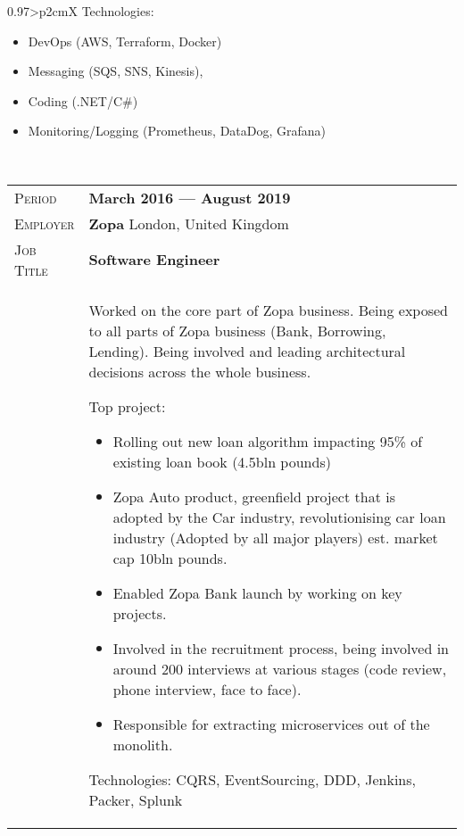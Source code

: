 \documentclass[a4paper, oneside, final]{article}
\begin{document}
\begin{center}
\begin{tabularx}{0.97\linewidth}{>{\raggedleft\scshape}p{2cm}X}
	Technologies:
	\begin{itemize}
	\item DevOps (AWS, Terraform, Docker)
	\item Messaging (SQS, SNS, Kinesis), 
	\item Coding (.NET/C\#)
	\item Monitoring/Logging (Prometheus, DataDog, Grafana)
	\end{itemize}
	\\
 \end{tabularx}
 \vspace{12pt}
 
\begin{tabularx}{0.97\linewidth}{>{\raggedleft\scshape}p{2cm}X}
 Period & \textbf{March 2016 --- August 2019 }\\
 Employer & \textbf{Zopa} \hfill London, United Kingdom\\
 Job Title & \textbf{Software Engineer}\\ 
	& Worked on the core part of Zopa business.
	 Being exposed to all parts of Zopa business (Bank, Borrowing, Lending).
	 Being involved and leading architectural decisions across the whole business.
	
	Top project:
	\begin{itemize}
	\item Rolling out new loan algorithm impacting 95\% of existing loan book (4.5bln pounds)
	\item Zopa Auto product, greenfield project that is adopted by the Car industry, revolutionising car loan industry (Adopted by all major players) est. market cap 10bln pounds.
	\item Enabled Zopa Bank launch by working on key projects.
	\item Involved in the recruitment process, being involved in around 200 interviews at various stages (code review, phone interview, face to face).
	\item Responsible for extracting microservices out of the monolith. 
 	\end{itemize}
	Technologies: CQRS, EventSourcing, DDD, Jenkins, Packer, Splunk\\
\end{tabularx}
\vspace{12pt}


\end{center}
\end{document}
